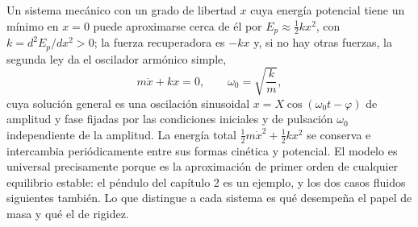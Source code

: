 \documentclass[10pt,openany]{book}
\begin{document}
Un sistema mecánico con un grado de libertad \(x\) cuya energía potencial tiene un mínimo en \(x = 0\) puede aproximarse cerca de él por \(E_p \approx \tfrac12 k x^{2}\), con \(k = d^{2}E_p/dx^{2} > 0\); la fuerza recuperadora es \(-kx\) y, si no hay otras fuerzas, la segunda ley da el oscilador armónico simple,
\begin{equation}
m\ddot x + k x = 0, \qquad \omega_0 = \sqrt{\frac{k}{m}}, \label{eq:c08-oscilador}
\end{equation}
cuya solución general es una oscilación sinusoidal \(x = X\cos(\omega_0 t - \varphi)\) de amplitud y fase fijadas por las condiciones iniciales y de pulsación \(\omega_0\) independiente de la amplitud. La energía total \(\tfrac12 m\dot x^{2} + \tfrac12 k x^{2}\) se conserva e intercambia periódicamente entre sus formas cinética y potencial. El modelo es universal precisamente porque es la aproximación de primer orden de cualquier equilibrio estable: el péndulo del capítulo 2 es un ejemplo, y los dos casos fluidos siguientes también. Lo que distingue a cada sistema es qué desempeña el papel de masa y qué el de rigidez.
\end{document}
